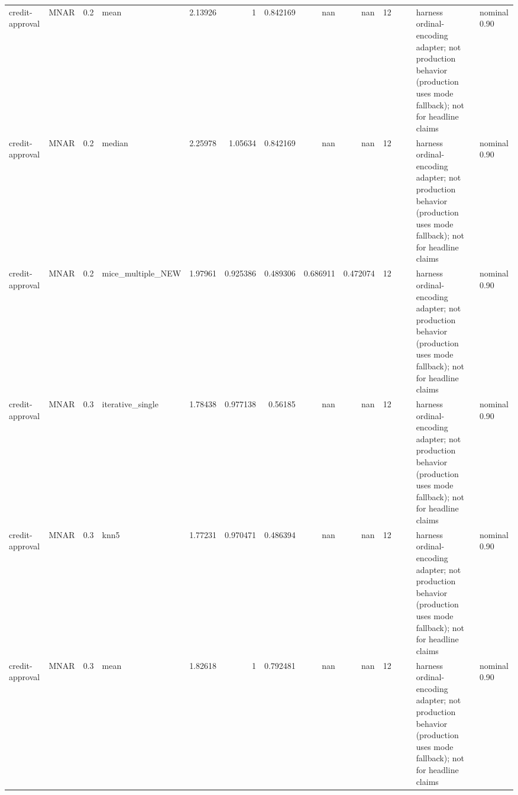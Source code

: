 \begin{table}[ht]
\begin{tabular}{llrlrrrrrrllll}
 credit-approval      & MNAR        &         0.2 & mean              &       2.13926  &             1        &                 0.842169 &                     nan        &                       nan        &        12 &                    &                                         & harness ordinal-encoding adapter; not production behavior (production uses mode fallback); not for headline claims & nominal 0.90              \\
 credit-approval      & MNAR        &         0.2 & median            &       2.25978  &             1.05634  &                 0.842169 &                     nan        &                       nan        &        12 &                    &                                         & harness ordinal-encoding adapter; not production behavior (production uses mode fallback); not for headline claims & nominal 0.90              \\
 credit-approval      & MNAR        &         0.2 & mice\_multiple\_NEW &       1.97961  &             0.925386 &                 0.489306 &                       0.686911 &                         0.472074 &        12 &                    &                                         & harness ordinal-encoding adapter; not production behavior (production uses mode fallback); not for headline claims & nominal 0.90              \\
 credit-approval      & MNAR        &         0.3 & iterative\_single  &       1.78438  &             0.977138 &                 0.56185  &                     nan        &                       nan        &        12 &                    &                                         & harness ordinal-encoding adapter; not production behavior (production uses mode fallback); not for headline claims & nominal 0.90              \\
 credit-approval      & MNAR        &         0.3 & knn5              &       1.77231  &             0.970471 &                 0.486394 &                     nan        &                       nan        &        12 &                    &                                         & harness ordinal-encoding adapter; not production behavior (production uses mode fallback); not for headline claims & nominal 0.90              \\
 credit-approval      & MNAR        &         0.3 & mean              &       1.82618  &             1        &                 0.792481 &                     nan        &                       nan        &        12 &                    &                                         & harness ordinal-encoding adapter; not production behavior (production uses mode fallback); not for headline claims & nominal 0.90              \\

\end{tabular}
\end{table}
